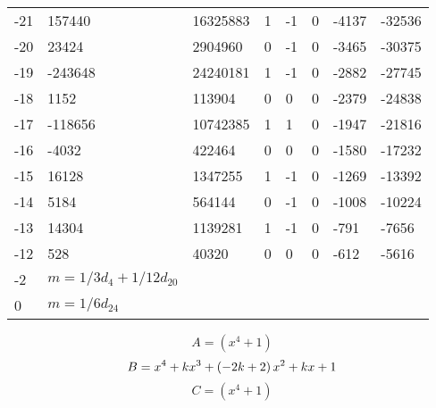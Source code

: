 \documentclass{amsart}
\begin{document}
\begin{longtable}{|l|l|l|lllll|}
-21&157440&16325883&1&-1&0&-4137&-32536\\
-20&23424&2904960&0&-1&0&-3465&-30375\\
-19&-243648&24240181&1&-1&0&-2882&-27745\\
-18&1152&113904&0&0&0&-2379&-24838\\
-17&-118656&10742385&1&1&0&-1947&-21816\\
-16&-4032&422464&0&0&0&-1580&-17232\\
-15&16128&1347255&1&-1&0&-1269&-13392\\
-14&5184&564144&0&-1&0&-1008&-10224\\
-13&14304&1139281&1&-1&0&-791&-7656\\
-12&528&40320&0&0&0&-612&-5616\\
-2&$m=1/3d_{4}+1/12d_{20}$&&\multicolumn{5}{c|}{}\\
0&$m=1/6d_{24}$&&\multicolumn{5}{c|}{}\\
\hline
\end{longtable}
$$A=(x^4
 + 1)$$
$$B=x^4
 + k\*x^3
 + \left(-2\*k
 + 2\right) \*x^2
 + k\*x
 + 1$$
$$C=(x^4
 + 1)$$
\end{document}
